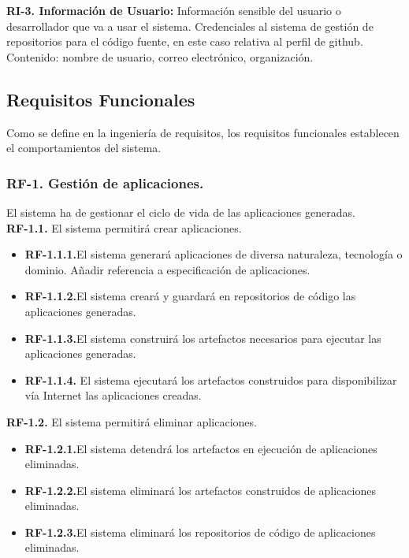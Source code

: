 \documentclass[a4paper,11pt]{book}
\begin{document}
\textbf{RI-3. Información de Usuario:} Información sensible del usuario o desarrollador que va a usar el sistema. Credenciales al sistema de gestión de repositorios para el código fuente, en este caso relativa al perfil de github.
Contenido: nombre de usuario, correo electrónico, organización. \\


\subsection{Requisitos Funcionales }
Como se define en la ingeniería de requisitos, los requisitos funcionales establecen el comportamientos del sistema.\\



\subsubsection { \textbf{ RF-1. Gestión de aplicaciones.}} El sistema ha de gestionar el ciclo de vida de las aplicaciones generadas.\\

\textbf{RF-1.1.} El sistema permitirá crear aplicaciones.
\begin{itemize}
 \item 	\textbf{RF-1.1.1.}El sistema generará aplicaciones de diversa naturaleza, tecnología o dominio. Añadir referencia a especificación de aplicaciones.
 \item 	\textbf{RF-1.1.2.}El sistema creará y  guardará en repositorios de código las aplicaciones generadas.
  \item \textbf{RF-1.1.3.}El sistema construirá los artefactos necesarios para ejecutar las aplicaciones generadas.
   \item  \textbf{RF-1.1.4.} El sistema ejecutará los artefactos construidos para disponibilizar vía Internet las aplicaciones creadas. \\
\end{itemize}


\textbf{RF-1.2.} El sistema permitirá eliminar aplicaciones.
\begin{itemize}
 \item 	\textbf{RF-1.2.1.}El sistema detendrá los artefactos en ejecución de aplicaciones eliminadas.
  \item 	\textbf{RF-1.2.2.}El sistema eliminará los artefactos construidos de aplicaciones eliminadas.
   \item  \textbf{RF-1.2.3.}El sistema eliminará los repositorios de código de aplicaciones eliminadas.	\\
\end{itemize}
\end{document}
